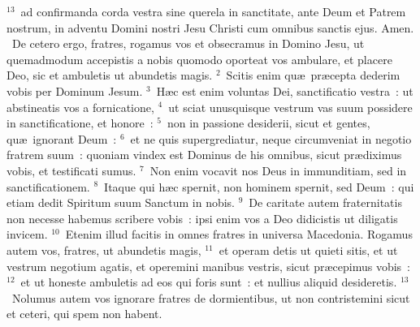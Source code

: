 ${}^{13}$~ad confirmanda corda vestra sine querela in sanctitate, ante Deum et Patrem nostrum, in adventu Domini nostri Jesu Christi cum omnibus sanctis ejus. Amen.
~De cetero ergo, fratres, rogamus vos et obsecramus in Domino Jesu, ut quemadmodum accepistis a nobis quomodo oporteat vos ambulare, et placere Deo, sic et ambuletis ut abundetis magis.
${}^{2}$~Scitis enim qu\ae\ pr\ae cepta dederim vobis per Dominum Jesum.
${}^{3}$~H\ae c est enim voluntas Dei, sanctificatio vestra~: ut abstineatis vos a fornicatione,
${}^{4}$~ut sciat unusquisque vestrum vas suum possidere in sanctificatione, et honore~:
${}^{5}$~non in passione desiderii, sicut et gentes, qu\ae\ ignorant Deum~:
${}^{6}$~et ne quis supergrediatur, neque circumveniat in negotio fratrem suum~: quoniam vindex est Dominus de his omnibus, sicut pr\ae diximus vobis, et testificati sumus.
${}^{7}$~Non enim vocavit nos Deus in immunditiam, sed in sanctificationem.
${}^{8}$~Itaque qui h\ae c spernit, non hominem spernit, sed Deum~: qui etiam dedit Spiritum suum Sanctum in nobis.
${}^{9}$~De caritate autem fraternitatis non necesse habemus scribere vobis~: ipsi enim vos a Deo didicistis ut diligatis invicem.
${}^{10}$~Etenim illud facitis in omnes fratres in universa Macedonia. Rogamus autem vos, fratres, ut abundetis magis,
${}^{11}$~et operam detis ut quieti sitis, et ut vestrum negotium agatis, et operemini manibus vestris, sicut pr\ae cepimus vobis~:
${}^{12}$~et ut honeste ambuletis ad eos qui foris sunt~: et nullius aliquid desideretis.
${}^{13}$~Nolumus autem vos ignorare fratres de dormientibus, ut non contristemini sicut et ceteri, qui spem non habent.


